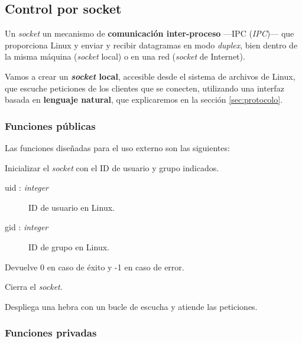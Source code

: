 \smallskip

\subsection{Control por socket}
\label{subsec:daemon}

Un \textit{socket} un mecanismo de \textbf{comunicación inter-proceso} ---\acrshort{IPC} (\textit{\acrlong{IPC}})--- que proporciona Linux y enviar y recibir datagramas en modo \textit{duplex}, bien dentro de la misma máquina (\textit{socket} local) o en una red (\textit{socket} de Internet).

Vamos a crear un \textbf{\textit{socket} local}, accesible desde el sistema de archivos de Linux, que escuche peticiones de los clientes que se conecten, utilizando una interfaz basada en \textbf{lenguaje natural}, que explicaremos en la sección \ref{sec:protocolo}.

\subsubsection{Funciones públicas}

Las funciones diseñadas para el uso externo son las siguientes:

\begin{description}[style=nextline]
	\item[socket\_init (uid, gid) : \textit{integer}]
	Inicializar el \textit{socket} con el ID de usuario y grupo indicados.
	
	\begin{description}
		\item[uid : \textit{integer}] ID de usuario en Linux.
		\item[gid : \textit{integer}] ID de grupo en Linux.
	\end{description}
	
	Devuelve 0 en caso de éxito y -1 en caso de error.
	
	\item[socket\_destroy ()]
	Cierra el \textit{socket}.
	
	\item[socket\_loop ()]
	Despliega una hebra con un bucle de escucha y atiende las peticiones.
	
\end{description}

\subsubsection{Funciones privadas}

